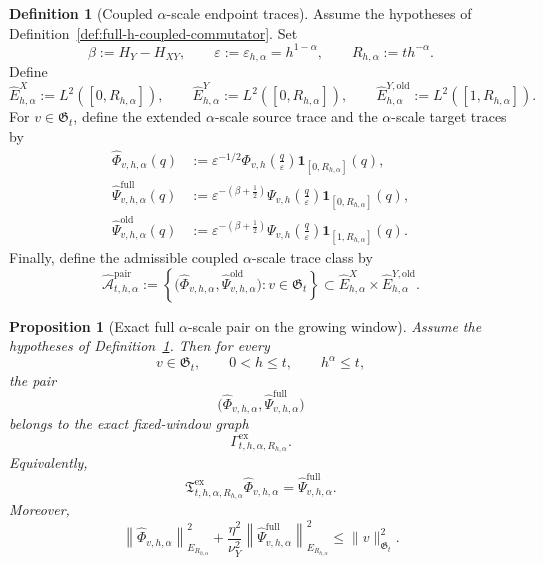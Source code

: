 \documentclass[11pt,a4paper]{amsart}
\theoremstyle{plain}
\newtheorem{proposition}[theorem]{Proposition}
\theoremstyle{definition}
\newtheorem{definition}[theorem]{Definition}
\theoremstyle{remark}
\newcommand{\one}{\mathbf 1}
\begin{document}
\begin{definition}[Coupled \(\alpha\)-scale endpoint traces]
\label{def:full-h-coupled-alpha}
Assume the hypotheses of Definition~\ref{def:full-h-coupled-commutator}. Set
\[
\beta:=H_Y-H_{XY},
\qquad
\varepsilon:=\varepsilon_{h,\alpha}=h^{1-\alpha},
\qquad
R_{h,\alpha}:=th^{-\alpha}.
\]
Define
\[
\widehat E_{h,\alpha}^{X}:=L^2([0,R_{h,\alpha}]),
\qquad
\widehat E_{h,\alpha}^{Y}:=L^2([0,R_{h,\alpha}]),
\qquad
\widehat E_{h,\alpha}^{Y,\mathrm{old}}:=L^2([1,R_{h,\alpha}]).
\]
For \(v\in\mathfrak G_t\), define the extended \(\alpha\)-scale source trace and the
\(\alpha\)-scale target traces by
\begin{align}
\widehat\Phi_{v,h,\alpha}(q)
&:=
\varepsilon^{-1/2}
\Phi_{v,h}\!\left(\frac{q}{\varepsilon}\right)
\one_{[0,R_{h,\alpha}]}(q),
\label{eq:full-h-coupled-alpha-X}\\
\widehat\Psi_{v,h,\alpha}^{\mathrm{full}}(q)
&:=
\varepsilon^{-(\beta+\frac12)}
\Psi_{v,h}\!\left(\frac{q}{\varepsilon}\right)
\one_{[0,R_{h,\alpha}]}(q),
\label{eq:full-h-coupled-alpha-Y-full}\\
\widehat\Psi_{v,h,\alpha}^{\mathrm{old}}(q)
&:=
\varepsilon^{-(\beta+\frac12)}
\Psi_{v,h}\!\left(\frac{q}{\varepsilon}\right)
\one_{[1,R_{h,\alpha}]}(q).
\label{eq:full-h-coupled-alpha-Y}
\end{align}
Finally, define the admissible coupled \(\alpha\)-scale trace class by
\begin{equation}\label{eq:full-h-coupled-alpha-class}
\widehat{\mathcal A}_{t,h,\alpha}^{\mathrm{pair}}
:=
\left\{
\bigl(
\widehat\Phi_{v,h,\alpha},
\widehat\Psi_{v,h,\alpha}^{\mathrm{old}}
\bigr)
:
v\in\mathfrak G_t
\right\}
\subset
\widehat E_{h,\alpha}^{X}\times \widehat E_{h,\alpha}^{Y,\mathrm{old}}.
\end{equation}
\end{definition}

\begin{proposition}[Exact full \(\alpha\)-scale pair on the growing window]
\label{prop:full-h-coupled-alpha-exact}
Assume the hypotheses of Definition~\ref{def:full-h-coupled-alpha}. Then for every
\[
v\in\mathfrak G_t,
\qquad
0<h\le t,
\qquad
h^\alpha\le t,
\]
the pair
\[
\bigl(
\widehat\Phi_{v,h,\alpha},
\widehat\Psi_{v,h,\alpha}^{\mathrm{full}}
\bigr)
\]
belongs to the exact fixed-window graph
\[
\Gamma_{t,h,\alpha,R_{h,\alpha}}^{\mathrm{ex}}.
\]
Equivalently,
\begin{equation}\label{eq:full-h-coupled-alpha-exact}
\mathfrak T_{t,h,\alpha,R_{h,\alpha}}^{\mathrm{ex}}
\widehat\Phi_{v,h,\alpha}
=
\widehat\Psi_{v,h,\alpha}^{\mathrm{full}}.
\end{equation}
Moreover,
\begin{equation}\label{eq:full-h-coupled-alpha-exact-bound}
\left\|
\widehat\Phi_{v,h,\alpha}
\right\|_{E_{R_{h,\alpha}}}^2
+
\frac{\eta^2}{\nu_Y^2}
\left\|
\widehat\Psi_{v,h,\alpha}^{\mathrm{full}}
\right\|_{E_{R_{h,\alpha}}}^2
\le
\|v\|_{\mathfrak G_t}^2.
\end{equation}
\end{proposition}
\end{document}
